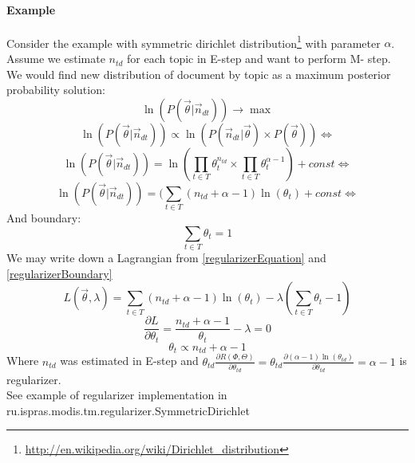 	\paragraph{Example}
	    Consider the example with symmetric dirichlet distribution\footnote{\url{http://en.wikipedia.org/wiki/Dirichlet_distribution}} with parameter $\alpha$.
	    Assume we estimate $n_{td}$ for each topic in E\--step and want to perform M\-- step. We would find new distribution of document by topic as a maximum posterior probability solution:
	    \begin{equation} \ln(P(\vec{\theta}| \vec{n}_{dt})) \to \max \end{equation}
	    \begin{equation} \ln(P(\vec{\theta}| \vec{n}_{dt})) \propto \ln(P(\vec{n}_{dt}|\vec{\theta}) \times P(\vec{\theta})) \Leftrightarrow \end{equation}
	    \begin{equation} \ln(P(\vec{\theta}| \vec{n}_{dt})) = \ln(\prod_{t \in T} \theta_t^{n_{td}} \times \prod_{t \in T}\theta_t^{\alpha - 1}) + const \Leftrightarrow  \end{equation}
	    \begin{equation} \label{regularizerEquation} \ln(P(\vec{\theta}| \vec{n}_{dt})) = (\sum_{t \in T}(n_{td} + \alpha - 1) \ln(\theta_t)  + const \Leftrightarrow  \end{equation}
	    And boundary:
	    \begin{equation} \label{regularizerBoundary} \sum_{t \in T} \theta_t = 1 \end{equation}
	    We may write down a Lagrangian from \ref{regularizerEquation} and \ref{regularizerBoundary}
	    \begin{equation} L(\vec{\theta}, \lambda) = \sum_{t \in T}(n_{td} + \alpha - 1) \ln(\theta_t) - \lambda (\sum_{t \in T} \theta_t - 1)  \end{equation}
	    \begin{equation} \frac{\partial L}{\partial \theta_t} = \frac{n_{td} + \alpha - 1}{\theta_t} - \lambda = 0  \end{equation}
	    \begin{equation} \theta_t \propto  n_{td} + \alpha - 1 \end{equation}
	    Where $n_{td}$ was estimated in E\--step and
	    $\theta_{td}\frac{\partial  R(\Phi, \Theta)}{\partial \theta_{td}} = \theta_{td} \frac{\partial (\alpha - 1)\ln(\theta_{td})}{\partial \theta_{td}} = \alpha - 1 $
	    is regularizer.\\
	    See example of regularizer implementation in ru.ispras.modis.tm.regularizer.SymmetricDirichlet
		
		